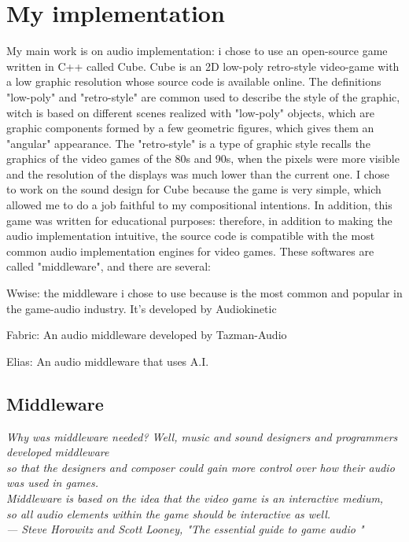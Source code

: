 
\chapter{My implementation}
\label{chp:fundamentals}

My main work is on audio implementation: i chose to use an open-source game written in C++ called Cube.
Cube is an 2D low-poly retro-style video-game with a low graphic resolution whose source code is available online. The definitions "low-poly" and "retro-style" are common used to describe the style of the graphic, witch is based on different scenes realized with "low-poly" objects, which are graphic components formed by a few geometric figures, which gives them an "angular" appearance. The "retro-style" is a type of graphic style recalls the graphics of the video games of the 80s and 90s, when the pixels were more visible and the resolution of the displays was much lower than the current one.
I chose to work on the sound design for Cube because the game is very simple, which allowed me to do a job faithful to my compositional intentions. In addition, this game was written for educational purposes: therefore, in addition to making the audio implementation intuitive, the source code is compatible with the most common audio implementation engines for video games. These softwares are called "middleware", and there are several:

\begin{compactitem}
	\item Wwise: the middleware i chose to use because is the most common and popular in the game-audio industry. It's developed by Audiokinetic
	\item Fabric: An audio middleware developed by Tazman-Audio
	\item Elias: An audio middleware that uses A.I.
\end{compactitem}



\section{Middleware}
\begin{flushright}
	\itshape
	Why was middleware needed? Well, music and sound designers and programmers developed middleware \\
	so that the designers and composer could gain more control over how their audio was used in games.\\
	Middleware is based on the idea that the video game is an interactive medium, \\
	so all audio elements within the game should be interactive as well. \\
	\medskip
	--- Steve Horowitz and Scott Looney, "The essential guide to game audio "
\end{flushright}

